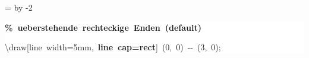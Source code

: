 \begingroup
\ttfamily
{}
=\textwidth
\advance{} by -2\fboxsep
\noindent
\colorbox{background}
{%
\parbox{\dimen255}
{%
\rule[-0.5ex]{0pt}{2.5ex}\hspace*{0.0em}\textcolor{G}{\textbf{\%~ueberstehende~rechteckige~Enden~(default)}}\\
\rule[-0.5ex]{0pt}{2.5ex}\hspace*{0.0em}\textbackslash{}draw[line~width=5mm,~\textcolor{R}{\textbf{line~cap=rect}}]~(0,~0)~{-}{-}~(3,~0);}%
}%
\endgroup
